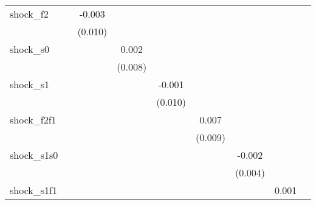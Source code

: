 {\begin{tabular}{l*{8}{c}}
\addlinespace
shock\_f2    &                     &      -0.003         &                     &                     &                     &                     &                     &                     \\
            &                     &     (0.010)         &                     &                     &                     &                     &                     &                     \\
\addlinespace
shock\_s0    &                     &                     &       0.002         &                     &                     &                     &                     &                     \\
            &                     &                     &     (0.008)         &                     &                     &                     &                     &                     \\
\addlinespace
shock\_s1    &                     &                     &                     &      -0.001         &                     &                     &                     &                     \\
            &                     &                     &                     &     (0.010)         &                     &                     &                     &                     \\
\addlinespace
shock\_f2f1  &                     &                     &                     &                     &       0.007         &                     &                     &                     \\
            &                     &                     &                     &                     &     (0.009)         &                     &                     &                     \\
\addlinespace
shock\_s1s0  &                     &                     &                     &                     &                     &      -0.002         &                     &                     \\
            &                     &                     &                     &                     &                     &     (0.004)         &                     &                     \\
\addlinespace
shock\_s1f1  &                     &                     &                     &                     &                     &                     &       0.001         &                     \\

\end{tabular}}

